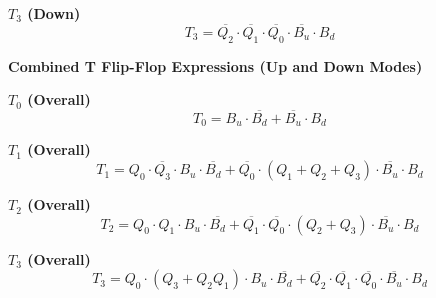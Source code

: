 \documentclass{article}
\begin{document}
    
    \textbf{$T_3$ (Down)}  
    \[
    T_3 = \overline{Q_2} \cdot \overline{Q_1} \cdot \overline{Q_0} \cdot \overline{B_u} \cdot B_d
    \]
    
    \begin{center}
    \end{center}
    \vspace{1cm}
    \newpage
    \textbf{Combined T Flip-Flop Expressions (Up and Down Modes)}
    \vspace{0.5cm}
    
    \textbf{$T_0$ (Overall)}  
    \[
    T_0 = B_u \cdot \overline{B_d} + \overline{B_u} \cdot B_d
    \]
    \vspace{0.5cm}
    
    \textbf{$T_1$ (Overall)}  
    \[
    T_1 = Q_0 \cdot \overline{Q_3} \cdot B_u \cdot \overline{B_d} + \overline{Q_0} \cdot (Q_1 + Q_2 + Q_3) \cdot \overline{B_u} \cdot B_d
    \]
    \vspace{0.5cm}
    
    \textbf{$T_2$ (Overall)}  
    \[
    T_2 = Q_0 \cdot Q_1 \cdot B_u \cdot \overline{B_d} + \overline{Q_1} \cdot \overline{Q_0} \cdot (Q_2 + Q_3) \cdot \overline{B_u} \cdot B_d
    \]
    \vspace{0.5cm}
    
    \textbf{$T_3$ (Overall)}  
    \[
    T_3 = Q_0 \cdot (Q_3 + Q_2 Q_1) \cdot B_u \cdot \overline{B_d} + \overline{Q_2} \cdot \overline{Q_1} \cdot \overline{Q_0} \cdot \overline{B_u} \cdot B_d
    \]
    
\end{document}

